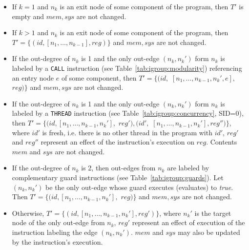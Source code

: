 \documentclass[10pt,twocolumn]{article}
\begin{document}
\begin{itemize}

\item If $ k = 1 $ and $ n_k $ is an exit node of some component of the program,
then $ T' $ is empty and $ \mathit{mem},\mathit{sys} $ are not changed.

\item If $ k > 1 $ and $ n_k $ is an exit node of some component of the program,
then $ T' = \{ (\mathit{id},[n_1,\ldots,n_{k-1}],\mathit{reg}) \} $ and $
\mathit{mem},\mathit{sys} $ are not changed.

\item If the out-degree of $ n_k $ is 1 and the only out-edge $ (n_k, n_k') $
form $ n_k $ is labeled by a \texttt{CALL} instruction (see
Table~\ref{tab:igroup:modularity}) referencing an entry node $ e $ of some
component, then $ T' = \{ (\mathit{id},$  $[n_1,\ldots,n_{k-1},n_k',e],$ 
$\mathit{reg}) \} $ and $ \mathit{mem},\mathit{sys} $ are not changed.

\item If the out-degree of $ n_k $ is 1 and the only out-edge $ (n_k, n_k') $
form $ n_k $ is labeled by a \texttt{THREAD} instruction (see
Table~\ref{tab:igroup:concurrency}, SID=0), then $ T' = \{
(\mathit{id},[n_1,\ldots,n_{k-1},n_k'],$  $\mathit{reg}'),
(\mathit{id}',$  $[n_1,\ldots,n_{k-1},n_k'],\mathit{reg}'') \} $, where $ \mathit{id}' $ is
fresh, i.e. there is no other thread in the program with $ \mathit{id}' $, $
\mathit{reg}' $ and $ \mathit{reg}'' $ represent an effect of the instruction's
execution on $ \mathit{reg} $. Contents $ \mathit{mem} $ and $ \mathit{sys} $
are not changed.

\item If the out-degree of $ n_k $ is 2, then out-edges from $ n_k $ are labeled
by complementary guard instructions (see Table~\ref{tab:igroup:guards}). Let $
(n_k, n_k') $ be the only out-edge whose guard executes (evaluates) to
\textit{true}. Then $ T' = \{ (\mathit{id},[n_1,\ldots,n_{k-1},n_k'],$ $\mathit{reg}) \}
$ and $ \mathit{mem},\mathit{sys} $ are not changed.

\item Otherwise, $ T' = \{ (\mathit{id},[n_1,\ldots,n_{k-1},n_k'], \mathit{reg}') \} $,
where $ n_k' $ is the target node of the only out-edge from $ n_k $, $
\mathit{reg}' $ represent an effect of execution of the instruction labeling the
edge $ (n_k,n_k') $. $ \mathit{mem} $ and $ \mathit{sys} $ may also be
updated by the instruction's execution.

\end{itemize}
\end{document}
